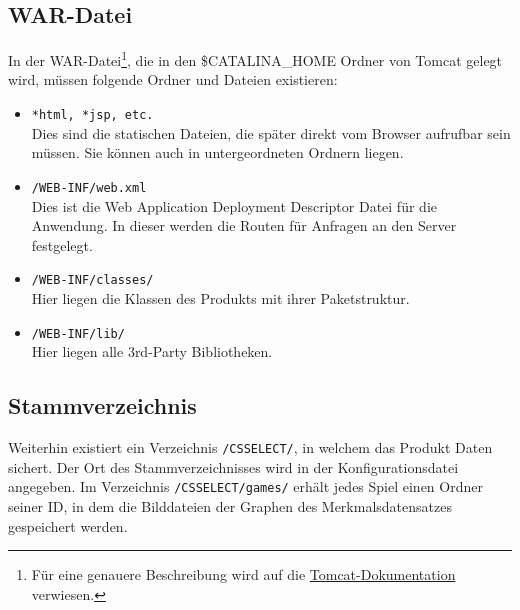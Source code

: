 \documentclass[a4paper]{scrreprt}
\begin{document}
	\subsection{WAR-Datei}
	In der WAR-Datei\footnote{Für eine genauere Beschreibung wird auf die \href{https://tomcat.apache.org/tomcat-7.0-doc/appdev/deployment.html\#Standard\_Directory\_Layout}{Tomcat-Dokumentation} verwiesen.}, die in den \$CATALINA\_HOME Ordner von Tomcat gelegt wird, müssen folgende Ordner und Dateien existieren:
	\begin{itemize}
		\item \texttt{*html, *jsp, etc.} \\Dies sind die statischen Dateien, die später direkt vom Browser aufrufbar sein müssen. Sie können auch in untergeordneten Ordnern liegen.
		\item \texttt{/WEB-INF/web.xml} \\Dies ist die Web Application Deployment Descriptor Datei für die Anwendung. In dieser werden die Routen für Anfragen an den Server festgelegt.
		\item \texttt{/WEB-INF/classes/} \\Hier liegen die Klassen des Produkts mit ihrer Paketstruktur.
		\item \texttt{/WEB-INF/lib/} \\Hier liegen alle 3rd-Party Bibliotheken.
	\end{itemize}
	\subsection{Stammverzeichnis}
	Weiterhin existiert ein Verzeichnis \texttt{/CSSELECT/}, in welchem das Produkt Daten sichert.
	Der Ort des Stammverzeichnisses wird in der Konfigurationsdatei angegeben.
	Im Verzeichnis \texttt{/CSSELECT/games/} erhält jedes Spiel einen Ordner seiner ID, in dem die Bilddateien der Graphen des Merkmalsdatensatzes gespeichert werden.
\end{document}
